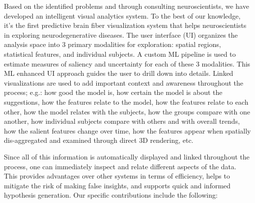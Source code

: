 Based on the identified problems and through consulting neuroscientists, we have developed an 
intelligent visual analytics system. To the best of our knowledge, it's the first predictive brain fiber visualization system that helps neuroscientists in exploring neurodegenerative diseases. The user interface (UI) organizes the analysis space into 3 primary modalities for exploration: spatial regions, statistical features, and individual subjects. A custom ML pipeline is used to estimate measures of saliency and uncertainty for each of these 3 modalities. 
This ML enhanced UI approach guides the user to drill down into details. Linked visualizations are used to add important context and awareness throughout the process; e.g.: how good the model is, how certain the model is about the suggestions, how the features relate to the model, how the features relate to each other, how the model relates with the subjects, how the groups compare with one another, how individual subjects compare with others and with overall trends, how the salient features change over time, how the features appear when spatially dis-aggregated and examined through direct 3D rendering, etc. 

Since all of this information is automatically displayed and linked throughout the process, one can immediately inspect and relate different aspects of the data. This provides advantages over other systems in terms of efficiency, helps to mitigate the risk of making false insights, and supports quick and informed hypothesis generation. Our specific contributions include the following:


